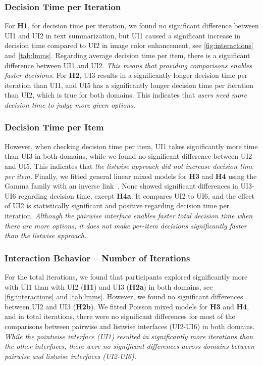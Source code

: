 \documentclass[acmsmall,screen,nonacm]{acmart}
\begin{document}
\subsubsection{Decision Time per Iteration}
For \textbf{H1}, for decision time per iteration, we found no significant difference between UI1 and UI2 in text summarization, but UI1 caused a significant increase in decision time compared to UI2 in image color enhancement, see \autoref{fig:interactions} and \autoref{tab:lmms}. Regarding average decision time per item, there is a significant difference between UI1 and UI2. \emph{This means that providing comparisons enables faster decisions.}
%
For \textbf{H2}, UI3 results in a significantly longer decision time per iteration than UI1, and UI5 has a significantly longer decision time per iteration than UI2, which is true for both domains. This indicates that \emph{users need more decision time to judge more given options}.

\subsubsection{Decision Time per Item}
However,  when checking decision time per item, UI1 takes significantly more time than UI3 in both domains, while we found no significant difference between UI2 and UI5. This indicates that \emph{the listwise approach did not increase decision time per item.}
%
Finally, we fitted general linear mixed models for \textbf{H3} and \textbf{H4} using the Gamma family with an inverse link~\cite{lo2015to}. None showed significant differences in UI3-UI6 regarding decision time, except \textbf{H4a}: It compares UI2 to UI6, and the effect of UI2 is statistically significant and positive regarding decision time per iteration. \emph{Although the pairwise interface enables faster total decision time when there are more options, it does not make per-item decisions significantly faster than the listwise approach.}

\subsubsection{Interaction Behavior – Number of Iterations}
For the total iterations, we found that participants explored significantly more with UI1 than with UI2 (\textbf{H1}) and UI3 (\textbf{H2a}) in both domains, see \autoref{fig:interactions} and \autoref{tab:lmms}. However, we found no significant differences between UI2 and UI3 (\textbf{H2b}). We fitted Poisson mixed models for \textbf{H3} and \textbf{H4}, and in total iterations, there were no significant differences for most of the comparisons between pairwise and listwise interfaces (UI2-UI6) in both domains. \emph{While the pointwise interface (UI1) resulted in significantly more iterations than the other interfaces, there were no significant differences across domains between pairwise and listwise interfaces (UI2-UI6).}
\end{document}
